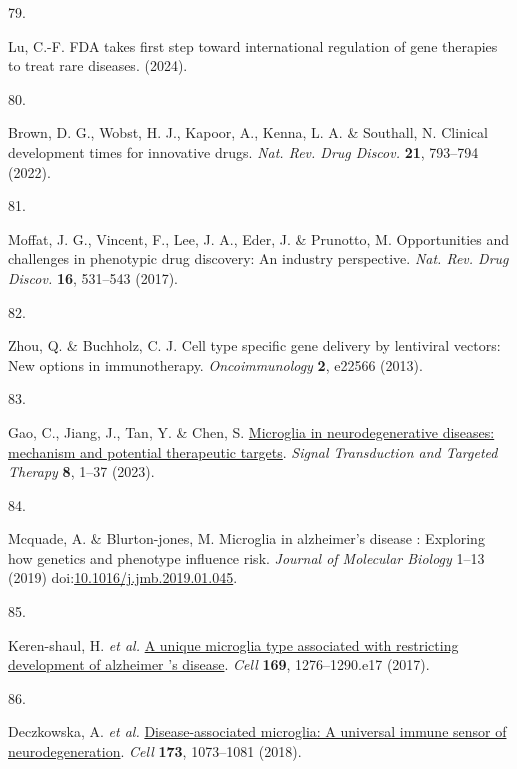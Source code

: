 \documentclass[
]{article}
\newlength{\cslhangindent}
\newlength{\csllabelwidth}
\newenvironment{CSLReferences}[2] %
 {\begin{list}{}{%
  \setlength{\itemindent}{0pt}
  \setlength{\leftmargin}{0pt}
  \setlength{\parsep}{0pt}
  \ifodd #1
   \setlength{\leftmargin}{\cslhangindent}
   \setlength{\itemindent}{-1\cslhangindent}
  \fi
  \setlength{\itemsep}{#2\baselineskip}}}
 {\end{list}}
\newcommand{\CSLLeftMargin}[1]{\parbox[t]{\csllabelwidth}{\strut#1\strut}}
\newcommand{\CSLRightInline}[1]{\parbox[t]{\linewidth - \csllabelwidth}{\strut#1\strut}}
\begin{document}
\begin{CSLReferences}{0}{0}
\CSLLeftMargin{79. }%
\CSLRightInline{Lu, C.-F. {FDA} takes first step toward international
regulation of gene therapies to treat rare diseases. (2024).}

\CSLLeftMargin{80. }%
\CSLRightInline{Brown, D. G., Wobst, H. J., Kapoor, A., Kenna, L. A. \&
Southall, N. Clinical development times for innovative drugs. \emph{Nat.
Rev. Drug Discov.} \textbf{21}, 793--794 (2022).}

\CSLLeftMargin{81. }%
\CSLRightInline{Moffat, J. G., Vincent, F., Lee, J. A., Eder, J. \&
Prunotto, M. Opportunities and challenges in phenotypic drug discovery:
An industry perspective. \emph{Nat. Rev. Drug Discov.} \textbf{16},
531--543 (2017).}

\CSLLeftMargin{82. }%
\CSLRightInline{Zhou, Q. \& Buchholz, C. J. Cell type specific gene
delivery by lentiviral vectors: New options in immunotherapy.
\emph{Oncoimmunology} \textbf{2}, e22566 (2013).}

\CSLLeftMargin{83. }%
\CSLRightInline{Gao, C., Jiang, J., Tan, Y. \& Chen, S.
\href{https://doi.org/10.1038/s41392-023-01588-0}{Microglia in
neurodegenerative diseases: mechanism and potential therapeutic
targets}. \emph{Signal Transduction and Targeted Therapy} \textbf{8},
1--37 (2023).}

\CSLLeftMargin{84. }%
\CSLRightInline{Mcquade, A. \& Blurton-jones, M. Microglia in
alzheimer's disease : Exploring how genetics and phenotype influence
risk. \emph{Journal of Molecular Biology} 1--13 (2019)
doi:\href{https://doi.org/10.1016/j.jmb.2019.01.045}{10.1016/j.jmb.2019.01.045}.}

\CSLLeftMargin{85. }%
\CSLRightInline{Keren-shaul, H. \emph{et al.}
\href{https://doi.org/10.1016/j.cell.2017.05.018}{A unique microglia
type associated with restricting development of alzheimer 's disease}.
\emph{Cell} \textbf{169}, 1276--1290.e17 (2017).}

\CSLLeftMargin{86. }%
\CSLRightInline{Deczkowska, A. \emph{et al.}
\href{https://doi.org/10.1016/j.cell.2018.05.003}{Disease-associated
microglia: A universal immune sensor of neurodegeneration}. \emph{Cell}
\textbf{173}, 1073--1081 (2018).}


\end{CSLReferences}
\end{document}
